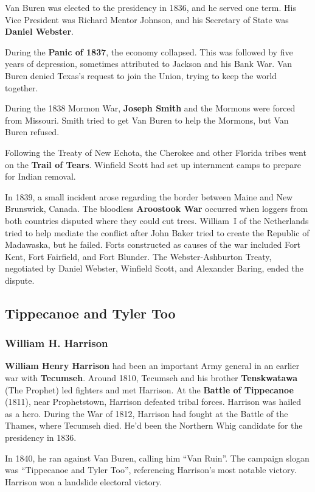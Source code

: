 Van Buren was elected to the presidency in 1836, and he served one term.
His Vice President was Richard Mentor Johnson,
and his Secretary of State was \textbf{Daniel Webster}.

During the \textbf{Panic of 1837}, the economy collapsed.
This was followed by five years of depression, sometimes attributed to Jackson and his Bank War.
Van Buren denied Texas's request to join the Union, trying to keep the world together.

During the 1838 Mormon War, \textbf{Joseph Smith} and the Mormons were forced from Missouri.
Smith tried to get Van Buren to help the Mormons, but Van Buren refused.

Following the Treaty of New Echota,
the Cherokee and other Florida tribes went on the \textbf{Trail of Tears}.
Winfield Scott had set up internment camps to prepare for Indian removal.

In 1839, a small incident arose regarding the border between Maine and New Brunswick, Canada.
The bloodless \textbf{Aroostook War}
occurred when loggers from both countries disputed where they could cut trees.
William~I of the Netherlands tried to help mediate the conflict
after John Baker tried to create the Republic of Madawaska, but he failed.
Forts constructed as causes of the war included Fort Kent, Fort Fairfield, and Fort Blunder.
The Webster-Ashburton Treaty,
negotiated by Daniel Webster, Winfield Scott, and Alexander Baring,
ended the dispute.

\subsection*{Tippecanoe and Tyler Too}

\subsubsection*{William H. Harrison}

\textbf{William Henry Harrison} had been an important Army general
in an earlier war with \textbf{Tecumseh}.
Around 1810,
Tecumseh and his brother \textbf{Tenskwatawa} (The Prophet) led fighters and met Harrison.
At the \textbf{Battle of Tippecanoe} (1811), near Prophetstown, Harrison defeated tribal forces.
Harrison was hailed as a hero.
During the War of 1812, Harrison had fought at the Battle of the Thames, where Tecumseh died.
He'd been the Northern Whig candidate for the presidency in 1836.

In 1840, he ran against Van Buren, calling him ``Van Ruin''.
The campaign slogan was ``Tippecanoe and Tyler Too'', referencing Harrison's most notable victory.
Harrison won a landslide electoral victory.

